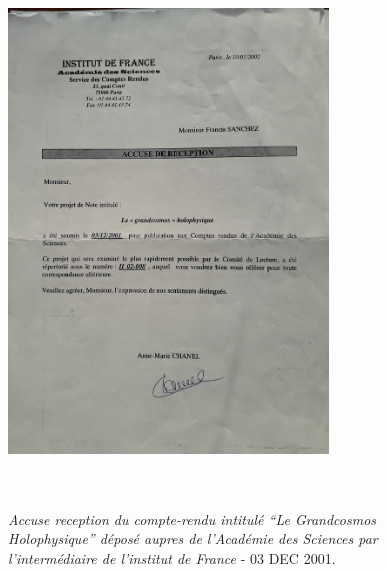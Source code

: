 \documentclass[a4paper,12pt]{article}
\begin{document}
\begin{appendix}
\begin{figure}
\centering
\includegraphics[width=8.5cm,height=14.5cm]{./figures/AcadSciences2001.jpg}
\caption[Accuse reception du depot du compte-rendu aupres de l'Academie des Sciences]{\textit{Accuse reception du compte-rendu intitulé ``Le Grandcosmos Holophysique'' déposé aupres de l'Académie des Sciences par l'intermédiaire de l'institut de France} - 03 DEC 2001.} 
\label{fig:14:figure14}
\end{figure}


\end{appendix}
\end{document}

